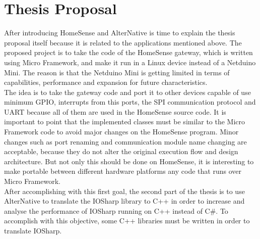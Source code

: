 \section{Thesis Proposal}\label{S:Proposal-Thesis-Proposal}
After introducing HomeSense and AlterNative is time to explain the thesis proposal itself because it is related to the applications mentioned above. The proposed project is to take the code of the HomeSense gateway, which is written using Micro Framework, and make it run in a Linux device instead of a Netduino Mini. The reason is that the Netduino Mini is getting limited in terms of capabilities, performance and expansion for future characteristics.
\\
The idea is to take the gateway code and port it to other devices capable of use minimum GPIO, interrupts from this ports, the SPI communication protocol and UART because all of them are used in the HomeSense source code. It is important to point that the implemented classes must be similar to the Micro Framework code to avoid major changes on the HomeSense program. Minor changes such as port renaming and communication module name changing are acceptable, because they do not alter the original execution flow and design architecture. But not only this should be done on HomeSense, it is interesting to make portable between different hardware platforms any code that runs over Micro Framework.
\\
After accomplishing with this first goal, the second part of the thesis is to use AlterNative to translate the IOSharp library to C++ in order to increase and analyse the performance of IOSharp running on C++ instead of C\#. To accomplish with this objective, some C++ libraries must be written in order to translate IOSharp.

